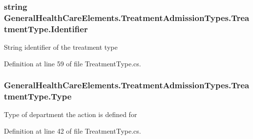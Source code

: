 \subsubsection[{\texorpdfstring{Identifier}{Identifier}}]{\setlength{\rightskip}{0pt plus 5cm}string General\+Health\+Care\+Elements.\+Treatment\+Admission\+Types.\+Treatment\+Type.\+Identifier\hspace{0.3cm}{\ttfamily [get]}}\hypertarget{class_general_health_care_elements_1_1_treatment_admission_types_1_1_treatment_type_a308d8c6f4a05246c4868c5bebb8619ce}{}\label{class_general_health_care_elements_1_1_treatment_admission_types_1_1_treatment_type_a308d8c6f4a05246c4868c5bebb8619ce}


String identifier of the treatment type 



Definition at line 59 of file Treatment\+Type.\+cs.

\subsubsection[{\texorpdfstring{Type}{Type}}]{ General\+Health\+Care\+Elements.\+Treatment\+Admission\+Types.\+Treatment\+Type.\+Type\hspace{0.3cm}{\ttfamily [get]}}\hypertarget{class_general_health_care_elements_1_1_treatment_admission_types_1_1_treatment_type_a635a2655be958c02a41f5922c1c1cbb5}{}\label{class_general_health_care_elements_1_1_treatment_admission_types_1_1_treatment_type_a635a2655be958c02a41f5922c1c1cbb5}


Type of department the action is defined for 



Definition at line 42 of file Treatment\+Type.\+cs.

